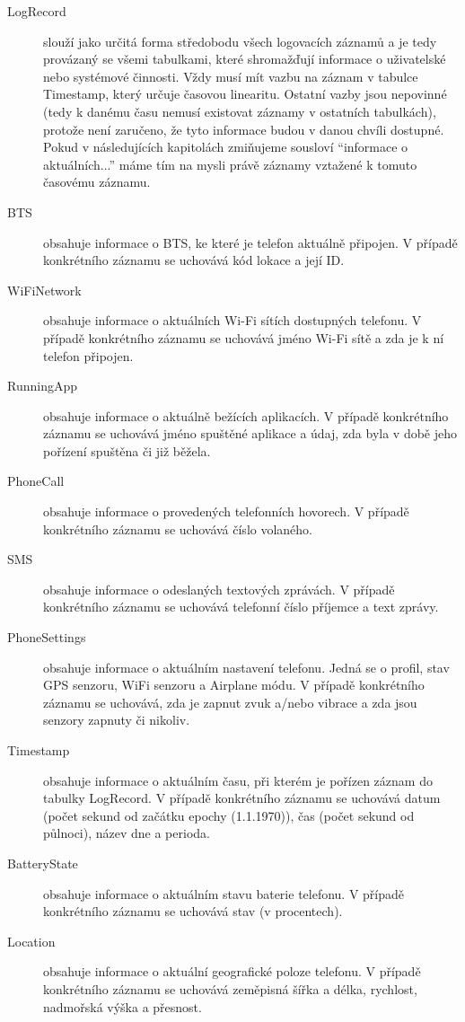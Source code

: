 \documentclass[thesis=M,czech]{FITthesis}[2012/06/26]
\begin{document}
\begin{description}
\item[LogRecord]
slouží jako určitá forma středobodu všech logovacích záznamů a je tedy provázaný se všemi tabulkami, které shromažďují informace o uživatelské nebo systémové činnosti. Vždy musí mít vazbu na záznam v tabulce Timestamp, který určuje časovou linearitu. Ostatní vazby jsou nepovinné (tedy k danému času nemusí existovat záznamy v ostatních tabulkách), protože není zaručeno, že tyto informace budou v danou chvíli dostupné. Pokud v následujících kapitolách zmiňujeme sousloví “informace o aktuálních...” máme tím na mysli právě záznamy vztažené k tomuto časovému záznamu.

\item[BTS]
obsahuje informace o BTS, ke které je telefon aktuálně připojen. V případě konkrétního záznamu se uchovává kód lokace a její ID.

\item[WiFiNetwork]
obsahuje informace o aktuálních Wi-Fi sítích dostupných telefonu. V případě konkrétního záznamu se uchovává jméno Wi-Fi sítě a zda je k ní telefon připojen.

\item[RunningApp]
obsahuje informace o aktuálně bežících aplikacích. V případě konkrétního záznamu se uchovává jméno spuštěné aplikace a údaj, zda byla v době jeho pořízení spuštěna či již běžela.

\item[PhoneCall]
obsahuje informace o provedených telefonních hovorech. V případě konkrétního záznamu se uchovává číslo volaného.

\item[SMS]
obsahuje informace o odeslaných textových zprávách. V případě konkrétního záznamu se uchovává telefonní číslo příjemce a text zprávy.

\item[PhoneSettings]
obsahuje informace o aktuálním nastavení telefonu. Jedná se o profil, stav GPS senzoru, WiFi senzoru a Airplane módu. V případě konkrétního záznamu se uchovává, zda je zapnut zvuk a/nebo vibrace a zda jsou senzory zapnuty či nikoliv.

\item[Timestamp]
obsahuje informace o aktuálním času, při kterém je pořízen záznam do tabulky LogRecord. V případě konkrétního záznamu se uchovává datum (počet sekund od začátku epochy (1.1.1970)), čas (počet sekund od půlnoci), název dne a perioda.

\item[BatteryState]
obsahuje informace o aktuálním stavu baterie telefonu. V případě konkrétního záznamu se uchovává stav (v procentech).

\item[Location]
obsahuje informace o aktuální geografické poloze telefonu. V případě konkrétního záznamu se uchovává zeměpisná šířka a délka, rychlost, nadmořská výška a přesnost.
\end{description}
\end{document}
